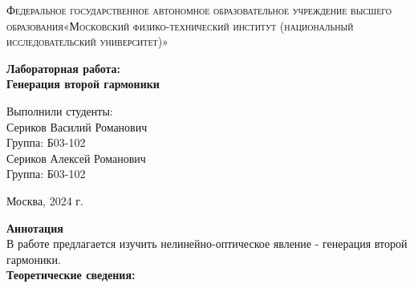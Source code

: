 \documentclass[a4paper, 12pt]{article}%
\begin{document}
	\begin{titlepage}
		\begin{center}
			\textsc{Федеральное государственное автономное образовательное учреждение высшего образования«Московский физико-технический институт (национальный исследовательский университет)»\\[5mm]
			}
			
			\vfill
			
			\textbf{Лабораторная работа: \\[3mm]
				Генерация второй гармоники
				\\[50mm]
			}
			
		\end{center}
		
		\hfill
		\begin{minipage}{.5\textwidth}
			Выполнили студенты:\\[2mm]
			Сериков Василий Романович\\[2mm]
			Группа: Б03-102\\[5mm]
			Сериков Алексей Романович\\[2mm]
			Группа: Б03-102\\[5mm]
			
		\end{minipage}
		\vfill
		\begin{center}
			Москва, 2024 г.
		\end{center}
		
	\end{titlepage}
	
	\newpage
	\textbf{Аннотация}\\
	
	В работе предлагается изучить нелинейно-оптическое явление - генерация второй гармоники.\\
	
	\textbf{Теоретические сведения: }\\
	
\end{document}
